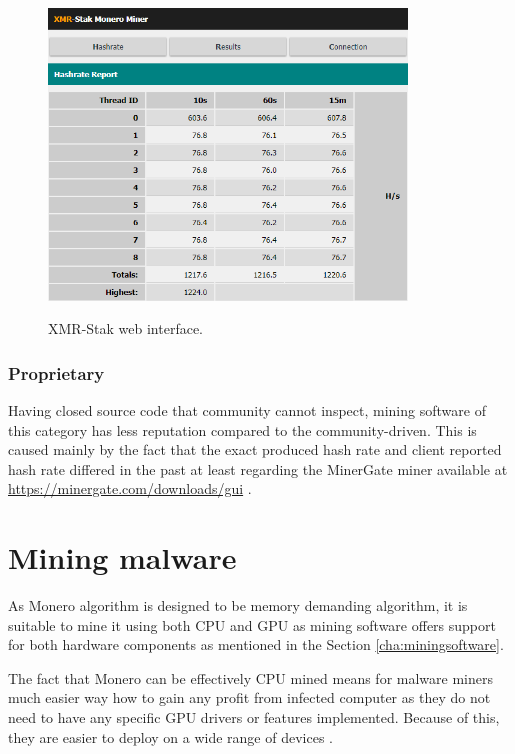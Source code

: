 \documentclass[
  printed, %
  table,   %
  lof,     %
  lot,     %
           oneside, color
]{fithesis3}
\begin{document}
\begin{figure}[H]
\begin{center}

    \vspace{-0.8em}
 \includegraphics[trim={0 0 0 0},clip,width=0.85\textwidth]{Screenshot_9.png}
    \caption{XMR-Stak web interface.}
    \vspace{-1.5em}
    \label{pic:withoutresdrawable}
\end{center}
    \end{figure}
    
\subsubsection{Proprietary}
Having closed source code that community cannot inspect, mining software of this category has less reputation compared to the community-driven. This is caused mainly by the fact that the exact produced hash rate and client reported hash rate differed in the past at least regarding the MinerGate miner available at \url{https://minergate.com/downloads/gui} .

\section{Mining malware }
\vspace{-0.2em}
As Monero algorithm is designed to be memory demanding algorithm, it is suitable to mine it using both CPU and GPU as mining software offers support for both hardware components as mentioned in the Section \ref{cha:miningsoftware}. 

The fact that Monero can be effectively CPU mined means for malware miners much easier way how to gain any profit from infected computer as they do not need to have any specific GPU drivers or features implemented. Because of this, they are easier to deploy on a wide range of devices \cite{le2018swimming}.
\vspace{-0.6em}
\end{document}
